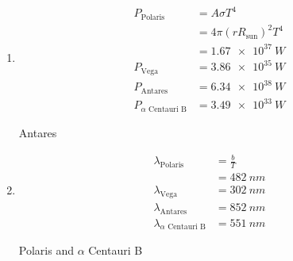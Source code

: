 \documentclass{article}
\begin{document}
\setcounter{subsubsection}{84}
\subsubsection{}

\begin{enumerate}
  \item

        \begin{align*}
          P_\text{Polaris}              & = A \sigma T^4                 \\
                                        & = 4 \pi (r R_\text{sun})^2 T^4 \\
                                        & = \qty{1.67e37}{W}             \\
          P_\text{Vega}                 & = \qty{3.86e35}{W}             \\
          P_\text{Antares}              & = \qty{6.34e38}{W}             \\
          P_{\alpha \text{ Centauri B}} & = \qty{3.49e33}{W}
        \end{align*}

        Antares

  \item

        \begin{align*}
          \lambda_\text{Polaris}              & = \frac{b}{T}   \\
                                              & = \qty{482}{nm} \\
          \lambda_\text{Vega}                 & = \qty{302}{nm} \\
          \lambda_\text{Antares}              & = \qty{852}{nm} \\
          \lambda_{\alpha \text{ Centauri B}} & = \qty{551}{nm}
        \end{align*}

        Polaris and $\alpha$ Centauri B
\end{enumerate}

\setcounter{subsubsection}{86}
\subsubsection{}
\end{document}
